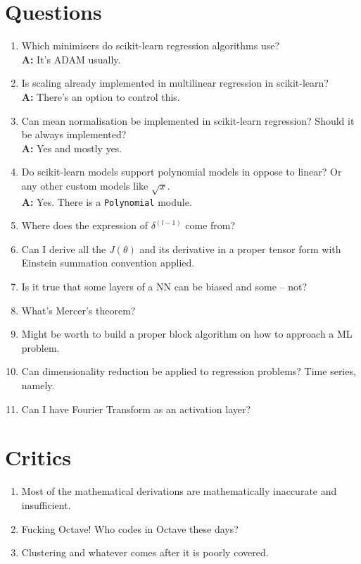 \documentclass[a4paper,11pt]{article}
\begin{document}
\section{Questions}
\begin{enumerate}
\item Which minimisers do scikit-learn regression algorithms use?\\
\textbf{A:} It's ADAM usually.
\item Is scaling already implemented in multilinear regression in scikit-learn?\\
\textbf{A:} There's an option to control this.
\item Can mean normalisation be implemented in scikit-learn regression? Should it be always implemented?\\
\textbf{A:} Yes and mostly yes.
\item Do scikit-learn models support polynomial models in oppose to linear? Or any other custom models like \textcolor{OliveGreen}{$\sqrt{x}$}.\\
\textbf{A:} Yes. There is a \texttt{Polynomial} module.
\item Where does the expression of \textcolor{OliveGreen}{$\delta^{(l-1)}$} come from?
\item Can I derive all the \textcolor{OliveGreen}{$J \left( \theta \right)$} and its derivative in a proper tensor form with Einstein summation convention applied.
\item Is it true that some layers of a NN can be biased and some -- not?
\item What's Mercer's theorem?
\item Might be worth to build a proper block algorithm on how to approach a ML problem.
\item Can dimensionality reduction be applied to regression problems? Time series, namely.
\item Can I have Fourier Transform as an activation layer?
\end{enumerate}

\section{Critics}
\begin{enumerate}
\item Most of the mathematical derivations are mathematically inaccurate and insufficient.
\item Fucking Octave! Who codes in Octave these days?
\item Clustering and whatever comes after it is poorly covered.
\end{enumerate}
\end{document}
